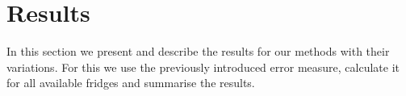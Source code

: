 \section{Results}
\label{sec:Results}

In this section we present and describe the results for our methods with their variations. For this we use the previously introduced error measure, calculate it for all available fridges and summarise the results. 